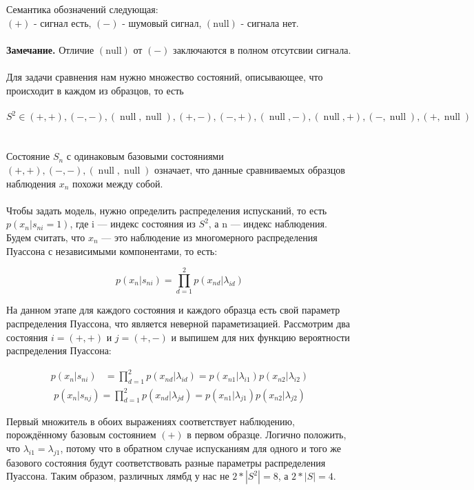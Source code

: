 \documentclass{matmex-diploma}
\begin{document}
Семантика обозначений следующая:
\\
$(+)$ - сигнал есть,  $(-)$ - шумовый сигнал, $\operatorname{(null)}$ - сигнала нет.
\\\\
\textbf{Замечание.} Отличие $\operatorname{(null)}$ от $(-)$ заключаются в полном отсутсвии сигнала.
\\\\
Для задачи сравнения нам нужно множество состояний, описывающее, что происходит в каждом из образцов, то есть
\\\\
$$S^2 \in {(+,+),(-,-),(\operatorname{null},\operatorname{null}),
(+,-),(-,+),(\operatorname{null},-),(\operatorname{null},+),(-,\operatorname{null}),(+,\operatorname{null})}$$
\\\\
Состояние $S_n$ с одинаковым базовыми состояниями $(+,+),(-,-),(\operatorname{null},\operatorname{null})$ означает, что данные сравниваемых образцов наблюдения $x_n$ похожи между собой.
\\\\

Чтобы задать модель, нужно определить распределения испусканий, то есть $p(x_n|s_{ni} = 1)$, где i — индекс состояния из $S^2$, а n — индекс наблюдения. Будем считать, что $x_n$ — это наблюдение из многомерного распределения Пуассона с независимыми компонентами, то есть:

$$p(x_n|s_{ni}) = \prod\limits_{d = 1}^2 p(x_{nd}|\lambda_{id})$$

На данном этапе для каждого состояния и каждого образца есть свой параметр распределения Пуассона, что является неверной параметизацией. Рассмотрим два состояния $i = (+, +)$ и $j = (+, -)$ и выпишем для них функцию вероятности распределения Пуассона:

\begin{align*}
p(x_n|s_{ni}) &= \prod\limits_{d = 1}^2 p(x_{nd}|\lambda_{id}) = p(x_{n1}|\lambda_{i1}) p(x_{n2}|\lambda_{i2})
\end{align*}
\begin{align*}
p(x_n|s_{nj}) = \prod\limits_{d = 1}^2 p(x_{nd}|\lambda_{jd}) = p(x_{n1}|\lambda_{j1}) p(x_{n2}|\lambda_{j2})
\end{align*}

Первый множитель в обоих выражениях соответствует наблюдению, порождённому базовым состоянием $(+)$ в первом образце. Логично положить, что $\lambda_{i1} = \lambda_{j1}$, потому что в обратном случае испусканиям для одного и того же базового состояния будут соответствовать разные параметры распределения Пуассона. Таким образом, различных лямбд у нас не $2 * |S^2| = 8$, а $2 * |S| = 4$.
\end{document}
